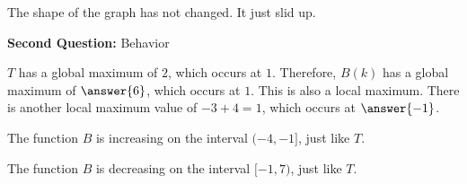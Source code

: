 \documentclass{ximera}
\begin{document}
\begin{example}
\begin{image}
\end{image}


The shape of the graph has not changed.  It just slid up.



\textbf{\textcolor{purple!85!blue}{Second Question:}}  Behavior


\begin{question}
$T$ has a global maximum of $2$, which occurs at $1$.  Therefore, $B(k)$ has a global maximum of $\answer{6}$, which occurs at $1$.  This is also a local maximum.  There is another local maximum value of $-3+4=1$, which occurs at $\answer{-1}$.
\end{question}

The function $B$ is increasing on the interval $(-4,-1]$, just like $T$. 

The function $B$ is decreasing on the interval $[-1, 7)$, just like $T$.

\end{example}
\end{document}
